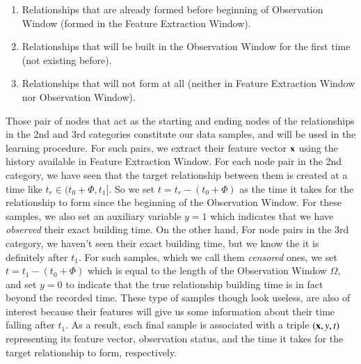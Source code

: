 \begin{enumerate}
	\item Relationships that are already formed before beginning of Observation Window (formed in the Feature Extraction Window).
	\item Relationships that will be built in the Observation Window for the first time (not existing before).
	\item Relationships that will not form at all (neither in Feature Extraction Window nor Observation Window).
\end{enumerate}

Those pair of nodes that act as the starting and ending nodes of the relationships in the 2nd and 3rd categories constitute our data samples, and will be used in the learning procedure. For such pairs, we extract their feature vector $\mathbf{x}$ using the history available in Feature Extraction Window. For each node pair in the 2nd category, we have seen that the target relationship between them is created at a time like $t_r\in(t_0+\Phi,t_1]$. So we set $t=t_r-(t_0+\Phi)$ as the time it takes for the relationship to form since the beginning of the Observation Window. For these samples, we also set an auxiliary variable $y=1$ which indicates that we have \emph{observed} their exact building time. On the other hand, For node pairs in the 3rd category, we haven't seen their exact building time, but we know the it is definitely after $t_1$. For such samples, which we call them \emph{censored} ones, we set $t=t_1-(t_0+\Phi)$ which is equal to the length of the Observation Window $\Omega$, and set $y=0$ to indicate that the true relationship building time is in fact beyond the recorded time. These type of samples though look useless, are also of interest because their features will give us some information about their time falling after $t_1$. As a result, each final sample is associated with a triple $(\mathbf{x},y,t)$ representing its feature vector, observation status, and the time it takes for the target relationship to form, respectively.



